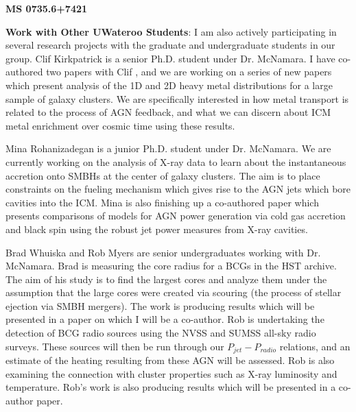 \documentclass[12pt]{article}
\begin{document}
{\bfseries{MS 0735.6+7421}}

{\bfseries{Work with Other UWateroo Students}}: I am also actively
participating in several research projects with the graduate and
undergraduate students in our group. Clif Kirkpatrick is a senior
Ph.D. student under Dr. McNamara. I have co-authored two papers with
Clif \cite{a1664, hydrametal}, and we are working on a series of new
papers which present analysis of the 1D and 2D heavy metal
distributions for a large sample of galaxy clusters. We are
specifically interested in how metal transport is related to the
process of AGN feedback, and what we can discern about ICM metal
enrichment over cosmic time using these results.

Mina Rohanizadegan is a junior Ph.D. student under Dr. McNamara. We
are currently working on the analysis of X-ray data to learn about the
instantaneous accretion onto SMBHs at the center of galaxy
clusters. The aim is to place constraints on the fueling mechanism
which gives rise to the AGN jets which bore cavities into the
ICM. Mina is also finishing up a co-authored paper which presents
comparisons of models for AGN power generation via cold gas accretion
and black spin using the robust jet power measures from X-ray
cavities.

Brad Whuiska and Rob Myers are senior undergraduates working with
Dr. McNamara. Brad is measuring the core radius for a BCGs in the HST
archive. The aim of his study is to find the largest cores and analyze
them under the assumption that the large cores were created via
scouring (the process of stellar ejection via SMBH mergers). The work
is producing results which will be presented in a paper on which I
will be a co-author. Rob is undertaking the detection of BCG radio
sources using the NVSS and SUMSS all-sky radio surveys. These sources
will then be run through our $P_{jet}-P_{radio}$ relations, and an
estimate of the heating resulting from these AGN will be assessed. Rob
is also examining the connection with cluster properties such as X-ray
luminosity and temperature. Rob's work is also producing results which
will be presented in a co-author paper.

\scriptsize


 
\end{document}
